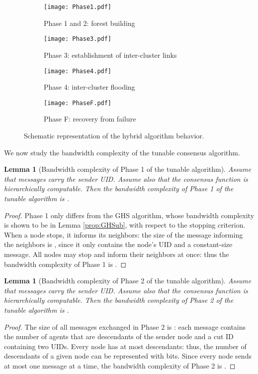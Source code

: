 \documentclass[letterpaper,10pt,conference]{ieeeconf}
\newtheorem{lemma}[theorem]{Lemma}
\begin{document}
\begin{figure}[h]
\centering
\begin{subfigure}[b]{0.2\textwidth}
\texttt{[image: Phase1.pdf]}
\caption{Phase 1 and 2: forest building}
\label{fig:hybridalgphase1}
\end{subfigure}
\begin{subfigure}[b]{0.2\textwidth}
\texttt{[image: Phase3.pdf]}
\caption{Phase 3: establishment of inter-cluster links}
\label{fig:hybridalgphase3}
\end{subfigure}

\begin{subfigure}[b]{0.2\textwidth}
\texttt{[image: Phase4.pdf]}
\caption{Phase 4: inter-cluster flooding}
\label{fig:hybridalgphase4}
\end{subfigure}
\begin{subfigure}[b]{0.2\textwidth}
\texttt{[image: PhaseF.pdf]}
\caption{Phase F: recovery from failure}
\label{fig:hybridalgphaseF}
\end{subfigure}
\caption{Schematic representation of the hybrid algorithm behavior.}
\label{fig:hybridalgschematic}
\end{figure}

We now study the bandwidth complexity of the tunable consensus algorithm.

\begin{lemma}[Bandwidth complexity of Phase 1 of the tunable algorithm]
\label{lemma:hybrid1ub}
Assume that messages carry the sender UID. Assume also that the consensus function is hierarchically computable. Then the bandwidth complexity of Phase 1 of the tunable algorithm is .
\end{lemma}
\begin{proof}
Phase 1 only differs from the GHS algorithm, whose bandwidth complexity is shown to be  in Lemma \ref{prop:GHSub}, with respect to the stopping criterion. When a node stops, it informs its neighbors: the size of the message informing the neighbors is , since it only contains the node's UID and a constant-size message. All nodes may stop and inform their neighbors at once: thus the bandwidth complexity of Phase 1 is .
\end{proof}

\begin{lemma}[Bandwidth complexity of Phase 2 of the tunable algorithm]
\label{lemma:hybrid2ub}
Assume that messages carry the sender UID. Assume also that the consensus function is hierarchically computable. Then the bandwidth complexity of Phase 2 of the tunable algorithm is .
\end{lemma}
\begin{proof}
The size of all messages exchanged in Phase 2 is : each message contains the number of agents that are descendants of the sender node and a cut ID containing two UIDs. Every node has at most  descendants: thus, the number of descendants of a given node can be represented with  bits. Since every node sends at most one message at a time, the bandwidth complexity of Phase 2 is .
\end{proof}
\end{document}
